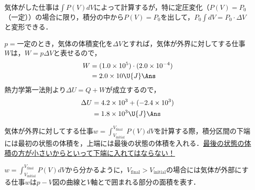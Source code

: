 
\setlength{\columnseprule}{0.4pt}
\begin{multicols}{2}
\raggedcolumns

\par\nopagebreak
\begin{sisin}
気体がした仕事は$\displaystyle\int P(V)dV$によって計算するが，特に定圧変化（$P(V)=P_0$（一定））の場合に限り，積分の中から$P(V)=P_0$を出して，$P_0\displaystyle\int dV=P_0\cdot\Delta V$と変形できる．
\end{sisin}
\KaiHead
\begin{komon}
 $p=$一定のとき，気体の体積変化を$\Delta V$とすれば，気体が外界に対してする仕事$W$は，$W=p\Delta V$と表せるので，
       \[\begin{aligned}
         W&=(1.0\times 10^5)\cdot(2.0\times 10^{-4})\\
          &=2.0\times 10\U{J}\Ans
       \end{aligned}\]
 熱力学第一法則より$\Delta U=Q+W$が成立するので，
       \[\begin{aligned}
         \Delta U&=4.2\times 10^3+(-2.4\times 10^3)\\
                 &=1.8\times 10^3\U{J}\Ans
       \end{aligned}\]
\end{komon}

\par\nopagebreak
\begin{sisin}
気体が外界に対してする仕事$w=$\hskip0pt$\displaystyle\int_{V_{\mathrm{initial}}}^{V_{\mathrm{final}}}P(V)dV$を計算する際，積分区間の下端には最初の状態の体積を，上端には最後の状態の体積を入れる．\underline{最後の状}\hskip0pt\underline{態の体積}\hskip0pt\underline{の方が小}\hskip0pt\underline{さいから}\hskip0pt\underline{といって}\hskip0pt\underline{下端に入}\hskip0pt\underline{れてはな}\hskip0pt\underline{らない！}

$w=\displaystyle\int_{V_{\mathrm{initial}}}^{V_{\mathrm{final}}}P(V)dV$から分かるように，$V_{\mathrm{final}}>V_{\mathrm{initial}}$の場合には気体が外部にする仕事$w$は$p-V$図の曲線と$V$軸とで囲まれる部分の面積を表す．


\end{sisin}
\end{multicols}
